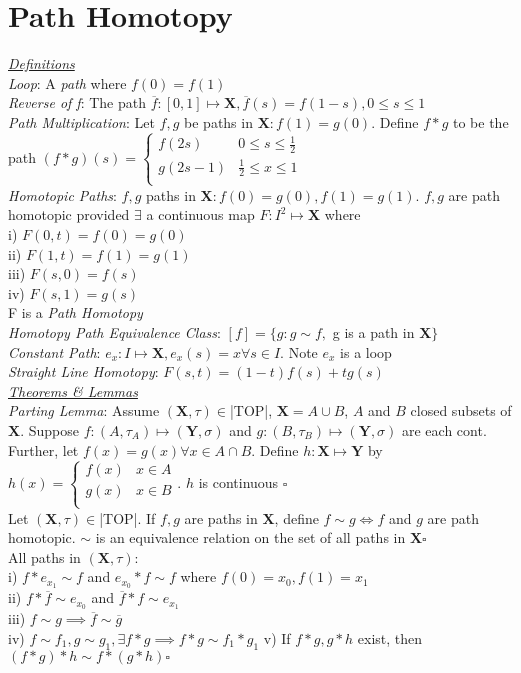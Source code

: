 \section{Path Homotopy}
\underline{\emph{Definitions}}\\
\emph{Loop}: A \emph{path} where $f(0)=f(1)$\\
\emph{Reverse of f}: The path $\overline{f}:[0,1]\mapsto\mathbf{X},\overline{f}(s)=f(1-s),0\leq s\leq 1$\\
\emph{Path Multiplication}: Let $f,g$ be paths in $\mathbf{X}:f(1)=g(0)$. Define $f*g$ to be the path $(f*g)(s)=
\begin{cases}
    f(2s) & 0\leq s\leq \frac{1}{2}\\
    g(2s-1) & \frac{1}{2}\leq x\leq 1\\
\end{cases}
$\\
\emph{Homotopic Paths}: $f,g$ paths in $\mathbf{X}:f(0)=g(0),f(1)=g(1)$. $f,g$ are path homotopic provided $\exists$ a continuous map $F:I^2\mapsto\mathbf{X}$ where\\
i) $F(0,t)=f(0)=g(0)$\\
ii) $F(1,t)=f(1)=g(1)$\\
iii) $F(s,0)=f(s)$\\
iv) $F(s,1)=g(s)$\\
F is a \emph{Path Homotopy}\\
\emph{Homotopy Path Equivalence Class}: $[f]=\{g:g\sim f,$ g is a path in $\mathbf{X}\}$\\
\emph{Constant Path}: $e_x:I\mapsto\mathbf{X},e_x(s)=x\forall s\in I$. Note $e_x$ is a loop\\
\emph{Straight Line Homotopy}: $F(s,t)=(1-t)f(s)+tg(s)$
\\\underline{\emph{Theorems \& Lemmas}}\\
\emph{Parting Lemma}: Assume $(\mathbf{X},\tau)\in$|TOP|, $\mathbf{X}=A\cup B$, $A$ and $B$ closed subsets of $\mathbf{X}$. Suppose $f:(A,\tau_A)\mapsto(\mathbf{Y},\sigma)$ and $g:(B,\tau_B)\mapsto(\mathbf{Y},\sigma)$ are each cont. Further, let $f(x)=g(x)\forall x\in A\cap B$. Define $h:\mathbf{X}\mapsto\mathbf{Y}$ by $h(x)=
\begin{cases}
    f(x) & x\in A\\
    g(x) & x\in B\\
\end{cases}$.  $h$ is continuous $\square$\\
Let $(\mathbf{X},\tau)\in$|TOP|. If $f,g$ are paths in $\mathbf{X}$, define $f\sim g\iff f$ and $g$ are path homotopic. $\sim $ is an equivalence relation on the set of all paths in $\mathbf{X} \square$\\
All paths in $(\mathbf{X},\tau)$:\\
i) $f*e_x_1\sim f$ and $e_x_0*f\sim f$ where $f(0)=x_0,f(1)=x_1$\\
ii) $f*\overline{f}\sim e_x_0$ and $\overline{f}*f\sim e_x_1$\\
iii) $f\sim g\implies\overline{f}\sim \overline{g}$\\
iv) $f\sim f_1,g\sim g_1,\exists f*g\implies f*g\sim f_1*g_1$
v) If $f*g,g*h$ exist, then $(f*g)*h\sim f*(g*h) \square$
